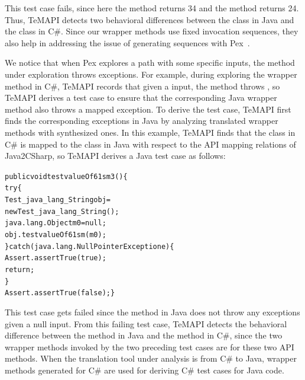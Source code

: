 This test case fails, since here the  method returns 34 and the  method returns 24. Thus, TeMAPI detects two behavioral differences between the  class in Java and the  class in C\#. Since our wrapper methods use fixed invocation sequences, they also help in addressing the issue of generating sequences with Pex~\cite{thummalapenta09:mseqgen}.

We notice that when Pex explores a path with some specific inputs, the method under exploration throws exceptions.
For example, during exploring the  wrapper method in C\#, TeMAPI records that given a  input, the method throws , so TeMAPI derives a test case to ensure that the corresponding Java wrapper method also throws a mapped exception. To derive the test case, TeMAPI first finds the corresponding exceptions in Java by analyzing translated wrapper methods with synthesized ones. In this example, TeMAPI finds that the  class in C\# is mapped to the  class in Java with respect to the API mapping relations of Java2CSharp, so TeMAPI derives a Java test case as follows:

\begin{CodeOut}\vspace*{-1.5ex}
\begin{alltt}
 public void testvalueOf61sm3()\{
   try\{
     Test_java_lang_String obj =
           new Test_java_lang_String();
     java.lang.Object m0 = null;
     obj.testvalueOf61sm(m0);
   \}catch(java.lang.NullPointerException e)\{
     Assert.assertTrue(true);
     return;
   \}
   Assert.assertTrue(false); \}
\end{alltt}
\end{CodeOut}\vspace*{-1ex}

This test case gets failed since the  method in Java does not throw any exceptions given a null input.
From this failing test case, TeMAPI detects the behavioral difference between the  method in Java and the  method in C\#, since the two wrapper methods invoked by the two preceding test cases are for these two API methods. When the translation tool under analysis is from C\# to Java, wrapper methods generated for C\# are used for deriving C\# test cases for Java code.

